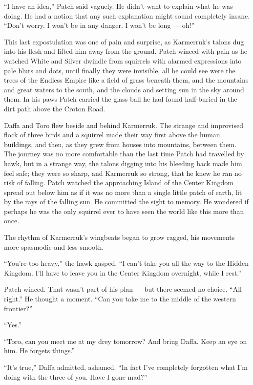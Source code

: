 \documentclass[ebook,oneside,openany,17pt]{memoir}
\begin{document}
“I have an idea,” Patch said vaguely. He didn’t want to explain what
he was doing. He had a notion that any such explanation might sound
completely insane. “Don’t worry. I won’t be in any danger. I won’t be
long — oh!”

This last expostulation was one of pain and surprise, as Karmerruk’s
talons dug into his flesh and lifted him away from the ground. Patch
winced with pain as he watched White and Silver dwindle from squirrels
with alarmed expressions into pale blurs and dots, until finally they
were invisible, all he could see were the trees of the Endless Empire
like a field of grass beneath them, and the mountains and great waters
to the south, and the clouds and setting sun in the sky around
them. In his paws Patch carried the glass ball he had found
half-buried in the dirt path above the Croton Road.

Daffa and Toro flew beside and behind Karmerruk. The strange and
improvised flock of three birds and a squirrel made their way first
above the human buildings, and then, as they grew from houses into
mountains, between them. The journey was no more comfortable than the
last time Patch had travelled by hawk, but in a strange way, the
talons digging into his bleeding back made him feel safe; they were so
sharp, and Karmerruk so strong, that he knew he ran no risk of
falling. Patch watched the approaching Island of the Center Kingdom
spread out below him as if it was no more than a single little patch
of earth, lit by the rays of the falling sun. He committed the sight
to memory. He wondered if perhaps he was the only squirrel ever to
have seen the world like this more than once.

The rhythm of Karmerruk’s wingbeats began to grow ragged, his
movements more spasmodic and less smooth.

“You’re too heavy,” the hawk gasped. “I can’t take you all the way to
the Hidden Kingdom. I’ll have to leave you in the Center Kingdom
overnight, while I rest.”

Patch winced. That wasn’t part of his plan — but there seemed no
choice. “All right.” He thought a moment. “Can you take me to the
middle of the western frontier?”

“Yes.”

“Toro, can you meet me at my drey tomorrow? And bring Daffa. Keep an
eye on him. He forgets things.”

“It’s true,” Daffa admitted, ashamed. “In fact I’ve completely
forgotten what I’m doing with the three of you. Have I gone mad?”
\end{document}
